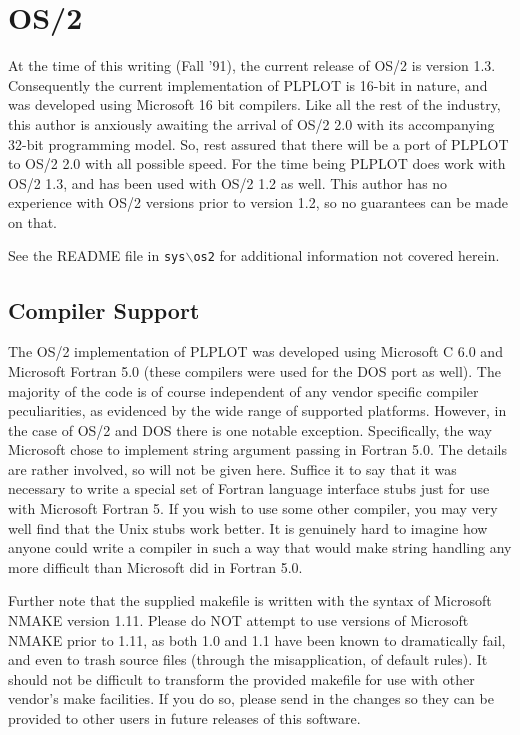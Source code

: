 \section{OS/2}

At the time of this writing (Fall '91), the current release of OS/2 is version
1.3.  Consequently the current implementation of PLPLOT is 16-bit in nature,
and was developed using Microsoft 16 bit compilers.  Like all the rest of 
the industry, this author is anxiously awaiting the arrival of OS/2 2.0 with
its accompanying 32-bit programming model.  So, rest assured that there will
be a port of PLPLOT to OS/2 2.0 with all possible speed.  For the time being
PLPLOT does work with OS/2 1.3, and has been used with OS/2 1.2 as well.  
This author
has no experience with OS/2 versions prior to version 1.2, so no guarantees 
can be
made on that.

See the README file in {\tt sys$\backslash$os2} for additional 
information not covered herein.

\subsection{Compiler Support}

The OS/2 implementation of PLPLOT was developed using Microsoft C 6.0
and Microsoft Fortran 5.0 (these compilers were used for the DOS port
as well).  The majority of the code is of course independent of any
vendor specific compiler peculiarities, as evidenced by the wide range
of supported platforms.  However, in the case of OS/2 and DOS there is 
one notable exception.
Specifically, the way Microsoft chose to implement string argument 
passing in Fortran 5.0.  The details are rather involved, so will not
be given here.  Suffice it to say that it was necessary to write a 
special set of Fortran language interface stubs just for use with 
Microsoft Fortran 5.  If you wish to use some other compiler, you may
very well find that the Unix stubs work better.  It is genuinely hard
to imagine how anyone could write a compiler in such a way that would
make string handling any more difficult than Microsoft did in Fortran 5.0.

Further note that the supplied makefile is written with the syntax of
Microsoft NMAKE version 1.11.  Please do NOT attempt to use versions of
Microsoft NMAKE prior to 1.11, as both 1.0 and 1.1 have been known to
dramatically fail, and even to trash source files (through the misapplication,
of default rules).  It should not be
difficult to transform the provided makefile for use with other vendor's
make facilities.  If you do so, please send in the changes so they can
be provided to other users in future releases of this software.

